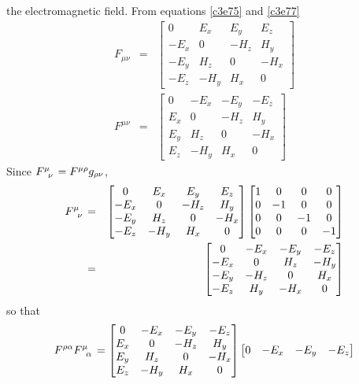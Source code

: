 \begin{enumerate}
the electromagnetic field.
From equations \eqref{c3e75} and \eqref{c3e77}
\begin{eqnarray*}
F_{\mu\nu} &=& \begin{bmatrix} 0 & E_x & E_y & E_z \\
-E_x & 0 & -H_z & H_y \\
-E_y & H_z & 0 & -H_x \\
-E_z & -H_y & H_x & 0
\end{bmatrix} \\
F^{\mu\nu} &=& \begin{bmatrix} 0 & -E_x & -E_y & -E_z \\
E_x & 0 & -H_z & H_y \\
E_y & H_z & 0 & -H_x \\
E_z & -H_y & H_x & 0
\end{bmatrix}
\end{eqnarray*}
Since $\tensor{F}{^\mu_\nu} = F^{\mu\rho}g_{\rho\nu}$,
\begin{eqnarray}
\tensor{F}{^\mu_\nu} &=& \begin{bmatrix} 0 & E_x & E_y & E_z \\
-E_x & 0 & -H_z & H_y \\
-E_y & H_z & 0 & -H_x \\
-E_z & -H_y & H_x & 0
\end{bmatrix}\begin{bmatrix}1 & 0 & 0 & 0 \\
0 & -1 & 0 & 0 \\
0 & 0 & -1 & 0 \\
0 & 0 & 0 & -1
\end{bmatrix} \nonumber \\
 &=& \begin{bmatrix}0 & -E_x & -E_y & -E_z \\
 -E_x & 0 & H_z & -H_y \\
 -E_y & -H_z & 0 & H_x \\
 -E_z & H_y & -H_x & 0 
 \end{bmatrix} \label{c4e85}
\end{eqnarray}
so that
\[
F^{\rho\alpha}\tensor{F}{^\mu_\alpha} = \begin{bmatrix}
0 & -E_x & -E_y & -E_z \\
E_x & 0 & -H_z & H_y \\
E_y & H_z & 0 & -H_x \\
E_z & -H_y & H_x & 0
\end{bmatrix}\begin{bmatrix}0 & -E_x & -E_y & -E_z \\

\end{bmatrix}\]
\end{enumerate}
